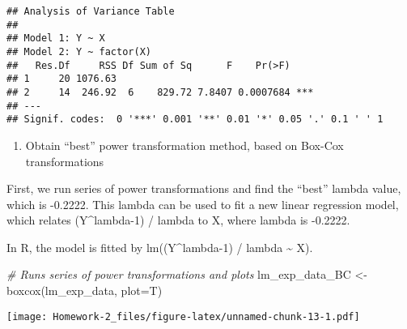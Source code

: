 \documentclass[
]{article}
\newenvironment{Shaded}{\begin{snugshade}}{\end{snugshade}}
\newcommand{\AttributeTok}[1]{\textcolor[rgb]{0.77,0.63,0.00}{#1}}
\newcommand{\CommentTok}[1]{\textcolor[rgb]{0.56,0.35,0.01}{\textit{#1}}}
\newcommand{\DecValTok}[1]{\textcolor[rgb]{0.00,0.00,0.81}{#1}}
\newcommand{\FunctionTok}[1]{\textcolor[rgb]{0.00,0.00,0.00}{#1}}
\newcommand{\NormalTok}[1]{#1}
\newcommand{\OtherTok}[1]{\textcolor[rgb]{0.56,0.35,0.01}{#1}}
\newcommand{\SpecialCharTok}[1]{\textcolor[rgb]{0.00,0.00,0.00}{#1}}
\newcommand{\StringTok}[1]{\textcolor[rgb]{0.31,0.60,0.02}{#1}}
\providecommand{\tightlist}{%
  \setlength{\itemsep}{0pt}\setlength{\parskip}{0pt}}
\begin{document}
\begin{verbatim}
## Analysis of Variance Table
## 
## Model 1: Y ~ X
## Model 2: Y ~ factor(X)
##   Res.Df     RSS Df Sum of Sq      F    Pr(>F)    
## 1     20 1076.63                                  
## 2     14  246.92  6    829.72 7.8407 0.0007684 ***
## ---
## Signif. codes:  0 '***' 0.001 '**' 0.01 '*' 0.05 '.' 0.1 ' ' 1
\end{verbatim}

\begin{enumerate}
\def\labelenumi{\alph{enumi})}
\setcounter{enumi}{9}
\tightlist
\item
  Obtain ``best'' power transformation method, based on Box-Cox
  transformations
\end{enumerate}

First, we run series of power transformations and find the ``best''
lambda value, which is -0.2222. This lambda can be used to fit a new
linear regression model, which relates (Y\^{}lambda-1) / lambda to X,
where lambda is -0.2222.

In R, the model is fitted by lm((Y\^{}lambda-1) / lambda
\textasciitilde{} X).

\begin{Shaded}
\begin{Highlighting}[]
\CommentTok{\# Runs series of power transformations and plots}
\NormalTok{lm\_exp\_data\_BC }\OtherTok{\textless{}{-}} \FunctionTok{boxcox}\NormalTok{(lm\_exp\_data, }\AttributeTok{plot=}\NormalTok{T)}
\end{Highlighting}
\end{Shaded}

\texttt{[image: Homework-2\_files/figure-latex/unnamed-chunk-13-1.pdf]}

\begin{Shaded}
\end{Shaded}
\end{document}
